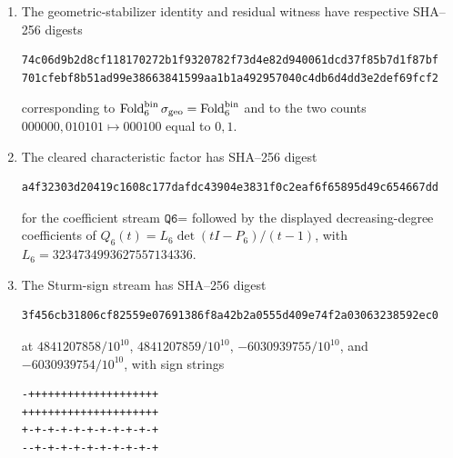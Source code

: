 \begin{proposition}
\begin{enumerate}[label=\textup{(\alph*)}]
\item The geometric-stabilizer identity and residual witness have respective SHA--256 digests
\begin{center}
\begin{minipage}{0.92\linewidth}
\begin{Verbatim}[breaklines=true,breakanywhere=true,fontsize=\scriptsize]
74c06d9b2d8cf118170272b1f9320782f73d4e82d940061dcd37f85b7d1f87bf
701cfebf8b51ad99e38663841599aa1b1a492957040c4db6d4dd3e2def69fcf2
\end{Verbatim}
\end{minipage}
\end{center}
corresponding to \(\operatorname{Fold}_6^{\mathrm{bin}}\sigma_{\mathrm{geo}}=\operatorname{Fold}_6^{\mathrm{bin}}\) and to the two counts \(000000,010101\mapsto000100\) equal to \(0,1\).
\item The cleared characteristic factor has SHA--256 digest
\begin{center}
\begin{minipage}{0.92\linewidth}
\begin{Verbatim}[breaklines=true,breakanywhere=true,fontsize=\scriptsize]
a4f32303d20419c1608c177dafdc43904e3831f0c2eaf6f65895d49c654667dd
\end{Verbatim}
\end{minipage}
\end{center}
for the coefficient stream \(\texttt{Q6=}\) followed by the displayed decreasing-degree coefficients of \(Q_6(t)=L_6\det(tI-P_6)/(t-1)\), with \(L_6=3234734993627557134336\).
\item The Sturm-sign stream has SHA--256 digest
\begin{center}
\begin{minipage}{0.92\linewidth}
\begin{Verbatim}[breaklines=true,breakanywhere=true,fontsize=\scriptsize]
3f456cb31806cf82559e07691386f8a42b2a0555d409e74f2a03063238592ec0
\end{Verbatim}
\end{minipage}
\end{center}
at \(4841207858/10^{10}\), \(4841207859/10^{10}\), \(-6030939755/10^{10}\), and \(-6030939754/10^{10}\), with sign strings
\begin{center}
\begin{minipage}{0.92\linewidth}
\begin{Verbatim}[breaklines=true,breakanywhere=true,fontsize=\scriptsize]
-++++++++++++++++++++
+++++++++++++++++++++
+-+-+-+-+-+-+-+-+-+-+
--+-+-+-+-+-+-+-+-+-+
\end{Verbatim}

\end{minipage}
\end{center}
\end{enumerate}
\end{proposition}

